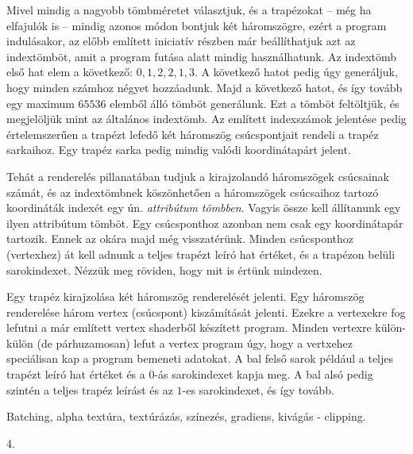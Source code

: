 \documentclass[12pt]{report}
\theoremstyle{definition}
\begin{document}
Mivel mindig a nagyobb tömbméretet választjuk, és a trapézokat -- még ha
elfajulók is -- mindig azonos módon bontjuk két háromszögre, ezért a program
indulásakor, az előbb említett iniciatív részben már beállíthatjuk azt az
indextömböt, amit a program futása alatt mindig használhatunk. Az indextömb
első hat elem a következő: $0, 1, 2, 2, 1, 3$. A következő hatot pedig úgy
generáljuk, hogy minden számhoz négyet hozzáadunk. Majd a következő hatot, és
így tovább egy maximum $65536$ elemből álló tömböt generálunk. Ezt a tömböt
feltöltjük, és megjelöljük mint az általános indextömb. Az említett indexszámok
jelentése pedig értelemszerűen a trapézt lefedő két háromszög csúcspontjait
rendeli a trapéz sarkaihoz. Egy trapéz sarka pedig mindig valódi koordinátapárt
jelent.

Tehát a renderelés pillanatában tudjuk a kirajzolandó háromszögek csúcsainak
számát, és az indextömbnek köszönhetően a háromszögek csúcsaihoz tartozó
koordináták indexét egy ún. \emph{attribútum tömbben}. Vagyis össze kell
állítanunk egy ilyen attribútum tömböt. Egy csúcsponthoz azonban nem csak egy
koordinátapár tartozik. Ennek az okára majd még visszatérünk. Minden
csúcsponthoz (vertexhez) át kell adnunk a teljes trapézt leíró hat értéket, és a
trapézon belüli sarokindexet. Nézzük meg röviden, hogy mit is értünk mindezen.

Egy trapéz kirajzolása két háromszög renderelését jelenti. Egy háromszög
renderelése három vertex (csúcspont) kiszámítását jelenti. Ezekre a vertexekre
fog lefutni a már említett vertex shaderből készített program. Minden vertexre
külön-külön (de párhuzamosan) lefut a vertex program úgy, hogy a vertxehez
speciálisan kap a program bemeneti adatokat. A bal felső sarok például a teljes
trapézt leíró hat értéket és a $0$-ás sarokindexet kapja meg. A bal alsó pedig
szintén a teljes trapéz leírást és az $1$-es sarokindexet, és így tovább.

  \begin{description}[noitemsep]
    \item[Kulcsszavak] Batching, alpha textúra, textúrázás, színezés,
    gradiens, kivágás - clipping.
    \item[Becsült oldalszám] 4.
  \end{description}


\end{document}
